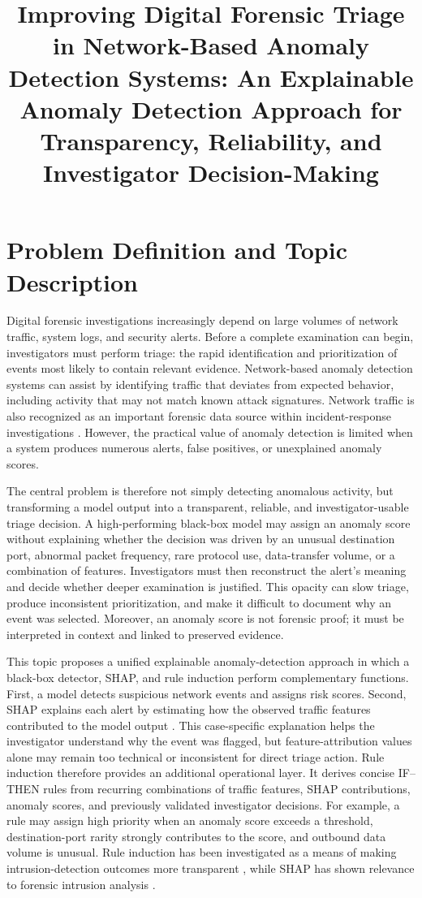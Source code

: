 \documentclass[conference]{IEEEtran}
\title{Improving Digital Forensic Triage in Network-Based Anomaly Detection Systems: An Explainable Anomaly Detection Approach for Transparency, Reliability, and Investigator Decision-Making}
\author{\IEEEauthorblockN{Damilola Popoola }}
\begin{document}
\maketitle

\section{Problem Definition and Topic Description}
Digital forensic investigations increasingly depend on large volumes of network traffic, system logs, and security alerts. Before a complete examination can begin, investigators must perform triage: the rapid identification and prioritization of events most likely to contain relevant evidence. Network-based anomaly detection systems can assist by identifying traffic that deviates from expected behavior, including activity that may not match known attack signatures. Network traffic is also recognized as an important forensic data source within incident-response investigations \cite{nist}. However, the practical value of anomaly detection is limited when a system produces numerous alerts, false positives, or unexplained anomaly scores.

The central problem is therefore not simply detecting anomalous activity, but transforming a model output into a transparent, reliable, and investigator-usable triage decision. A high-performing black-box model may assign an anomaly score without explaining whether the decision was driven by an unusual destination port, abnormal packet frequency, rare protocol use, data-transfer volume, or a combination of features. Investigators must then reconstruct the alert's meaning and decide whether deeper examination is justified. This opacity can slow triage, produce inconsistent prioritization, and make it difficult to document why an event was selected. Moreover, an anomaly score is not forensic proof; it must be interpreted in context and linked to preserved evidence.

This topic proposes a unified explainable anomaly-detection approach in which a black-box detector, SHAP, and rule induction perform complementary functions. First, a model detects suspicious network events and assigns risk scores. Second, SHAP explains each alert by estimating how the observed traffic features contributed to the model output \cite{shap}. This case-specific explanation helps the investigator understand why the event was flagged, but feature-attribution values alone may remain too technical or inconsistent for direct triage action. Rule induction therefore provides an additional operational layer. It derives concise IF--THEN rules from recurring combinations of traffic features, SHAP contributions, anomaly scores, and previously validated investigator decisions. For example, a rule may assign high priority when an anomaly score exceeds a threshold, destination-port rarity strongly contributes to the score, and outbound data volume is unusual. Rule induction has been investigated as a means of making intrusion-detection outcomes more transparent \cite{adewole}, while SHAP has shown relevance to forensic intrusion analysis \cite{hermosilla}.
\end{document}
